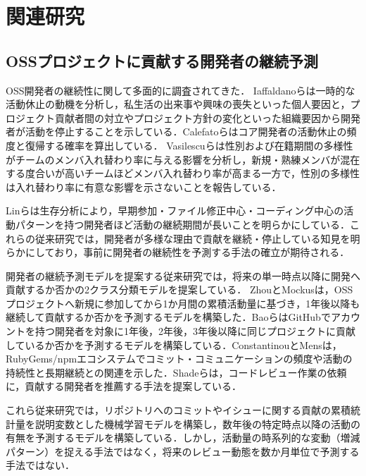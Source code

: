 \documentclass[submit,noauthor,ses,dvipdfmx]{ipsj}
\begin{document}
\section{関連研究}\label{sec:RelaatedWork}

\subsection{OSSプロジェクトに貢献する開発者の継続予測}
OSS開発者の継続性に関して多面的に調査されてきた．
Iaffaldanoらは一時的な活動休止の動機を分析し，私生活の出来事や興味の喪失といった個人要因と，プロジェクト貢献者間の対立やプロジェクト方針の変化といった組織要因から開発者が活動を停止することを示している\cite{iaffaldano}．Calefatoらはコア開発者の活動休止の頻度と復帰する確率を算出している\cite{calefato}．
Vasilescuらは性別および在籍期間の多様性がチームのメンバ入れ替わり率に与える影響を分析し，新規・熟練メンバが混在する度合いが高いチームほどメンバ入れ替わり率が高まる一方で，性別の多様性は入れ替わり率に有意な影響を示さないことを報告している\cite{vasilescu}．

Linらは生存分析により，早期参加・ファイル修正中心・コーディング中心の活動パターンを持つ開発者ほど活動の継続期間が長いことを明らかにしている\cite{lin}．これらの従来研究では，開発者が多様な理由で貢献を継続・停止している知見を明らかにしており，事前に開発者の継続性を予測する手法の確立が期待される．

開発者の継続予測モデルを提案する従来研究では，将来の単一時点以降に開発へ貢献するか否かの2クラス分類モデルを提案している．
ZhouとMockusは，OSSプロジェクトへ新規に参加してから1か月間の累積活動量に基づき，1年後以降も継続して貢献するか否かを予測するモデルを構築した\cite{zhou}．BaoらはGitHubでアカウントを持つ開発者を対象に1年後，2年後，3年後以降に同じプロジェクトに貢献しているか否かを予測するモデルを構築している\cite{bao}．ConstantinouとMensは，RubyGems/npmエコシステムでコミット・コミュニケーションの頻度や活動の持続性と長期継続との関連を示した\cite{constantinou}．Shadeらは，コードレビュー作業の依頼に，貢献する開発者を推薦する手法を提案している\cite{shade}．

これら従来研究では，リポジトリへのコミットやイシューに関する貢献の累積統計量を説明変数とした機械学習モデルを構築し，数年後の特定時点以降の活動の有無を予測するモデルを構築している．しかし，活動量の時系列的な変動（増減パターン）を捉える手法ではなく，将来のレビュー動態を数か月単位で予測する手法ではない．
\end{document}
